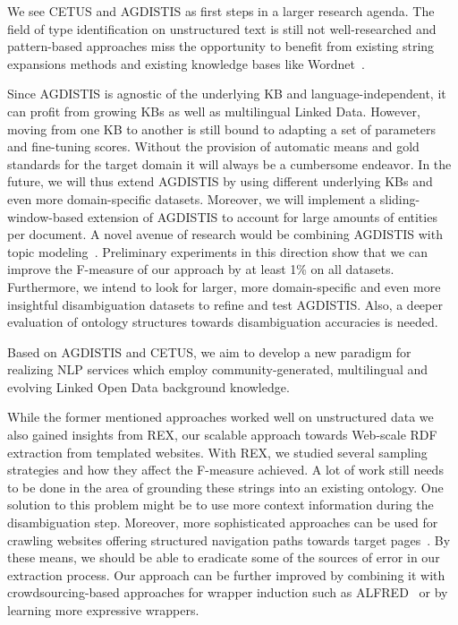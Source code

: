 We see CETUS and AGDISTIS as first steps in a larger research agenda.
The field of type identification on unstructured text is still not well-researched and pattern-based approaches miss the opportunity to benefit from existing string expansions methods and existing knowledge bases like Wordnet~\cite{wordnet}.


Since AGDISTIS is agnostic of the underlying \ac{KB} and language-independent, it can profit from growing \ac{KB}s as well as multilingual Linked Data.
However, moving from one \ac{KB} to another is still bound to adapting a set of parameters and fine-tuning scores. 
Without the provision of automatic means and gold standards for the target domain it will always be a cumbersome endeavor. 
In the future, we will thus extend AGDISTIS by using different underlying \ac{KB}s and even more domain-specific datasets.
Moreover, we will implement a sliding-window-based extension of AGDISTIS to account for large amounts of entities per document.
A novel avenue of research would be combining AGDISTIS with topic modeling~\cite{Blei:2003:LDA:944919.944937}. 
Preliminary experiments in this direction show that we can improve the F-measure of our approach by at least 1\% on all datasets.
Furthermore, we intend to look for larger, more domain-specific and even more insightful disambiguation datasets to refine and test AGDISTIS.
Also, a deeper evaluation of ontology structures towards disambiguation accuracies is needed.

Based on AGDISTIS and CETUS, we aim to develop a new paradigm for realizing \ac{NLP} services which employ community-generated, multilingual and evolving Linked Open Data background knowledge.



While the former mentioned approaches worked well on unstructured data we also gained insights from REX, our scalable approach towards Web-scale RDF extraction from templated websites. 
With REX, we studied several sampling strategies and how they affect the F-measure achieved.
A lot of work still needs to be done in the area of grounding these strings into an existing ontology.
One solution to this problem might be to use more context information during the disambiguation step.
Moreover, more sophisticated approaches can be used for crawling websites offering structured navigation paths towards target pages~\cite{DBLP:conf/webist/BlancoCM05}. 
By these means, we should be able to eradicate some of the sources of error in our extraction process. 
Our approach can be further improved by combining it with crowdsourcing-based approaches for wrapper induction such as ALFRED~\cite{Crescenzi2013} or by learning more expressive wrappers.

